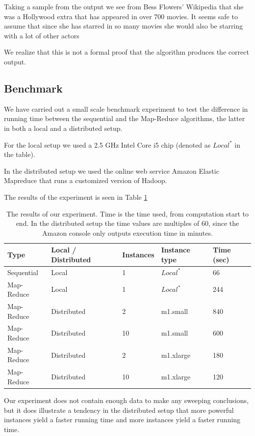 \documentclass[a4paper,11pt]{article}
\begin{document}
Taking a sample from the output we see from Bess Flowers' Wikipedia that she was a Hollywood extra that has appeared in over 700 movies. It seems safe to assume that since she has starred in so many movies she would also be starring with a lot of other actors

We realize that this is not a formal proof that the algorithm produces the correct output.

\subsection{Benchmark}
We have carried out a small scale benchmark experiment to test the difference in running time between the sequential and the Map-Reduce algorithms, the latter in both a local and a distributed setup. 

For the local setup we used a 2.5 GHz Intel Core i5 chip (denoted as $Local^*$ in the table). 

In the distributed setup we used the online web service Amazon Elastic Mapreduce that runs a customized version of Hadoop. 

The results of the experiment is seen in Table \ref{tab:benchmark}

\begin{table}[H]

\begin{center}
    \begin{tabular}{|l|l|l|l|l|}
    \hline
    Type       & Local / Distributed & Instances & Instance type                     & Time (sec) \\ \hline
    Sequential & Local               & 1         & $Local^*$ & 66                 \\ \hline
    Map-Reduce & Local               & 1         & $Local^*$ & 244                 \\ \hline
    Map-Reduce & Distributed         & 2         & m1.small                          & 840                 \\ \hline
    Map-Reduce & Distributed         & 10        & m1.small                          & 600                 \\ \hline
    Map-Reduce & Distributed         & 2         & m1.xlarge                         & 180                 \\ \hline
    Map-Reduce & Distributed         & 10        & m1.xlarge                         & 120                 \\ \hline
    \end{tabular}
    \end{center}
    \caption{The results of our experiment. Time is the time used, from computation start to end. In the distributed setup the time values are multiples of 60, since the Amazon console only outputs execution time in minutes.}\label{tab:benchmark}
\end{table}
Our experiment does not contain enough data to make any sweeping conclusions, but it does illustrate a tendency in the distributed setup that more powerful instances yield a faster running time and more instances yield a faster running time. 
\end{document}
